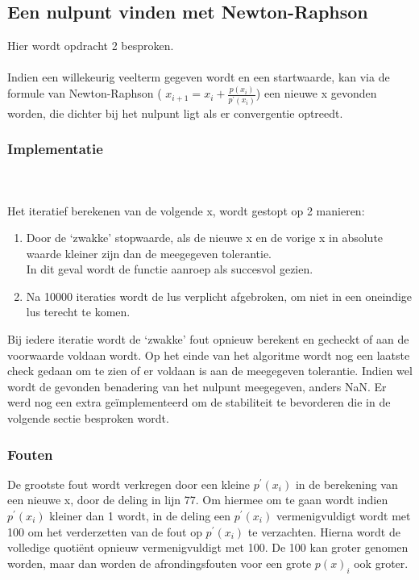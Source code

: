 \documentclass[a4paper,kulak]{kulakarticle}
\begin{document}
\subsection{Een nulpunt vinden met Newton-Raphson}
Hier wordt opdracht 2 besproken.
\\~\\
Indien een willekeurig veelterm gegeven wordt en een startwaarde, kan via de formule van Newton-Raphson (
$x_{i+1} = x_i + \frac{ p(x_i) }{ p^{'}(x_i) }$) een nieuwe x gevonden worden, die dichter bij het nulpunt ligt als er convergentie optreedt.

\subsubsection{Implementatie}
\label{sec:NR}

~\\~\\
Het iteratief berekenen van de volgende x, wordt gestopt op 2 manieren:
\begin{enumerate}
	\item Door de `zwakke' stopwaarde, als de nieuwe x en de vorige x in absolute waarde kleiner zijn dan de meegegeven tolerantie.\\
	In dit geval wordt de functie aanroep als succesvol gezien.
	\item Na 10000 iteraties wordt de lus verplicht afgebroken, om niet in een oneindige lus terecht te komen.
\end{enumerate}

Bij iedere iteratie wordt de `zwakke' fout opnieuw berekent en gecheckt of aan de voorwaarde voldaan wordt.
Op het einde van het algoritme wordt nog een laatste check gedaan om te zien of er voldaan is aan de meegegeven tolerantie. Indien wel wordt de gevonden benadering van het nulpunt meegegeven, anders NaN.
Er werd nog een extra geïmplementeerd om de stabiliteit te bevorderen die in de volgende sectie besproken wordt.

\subsubsection{Fouten}
De grootste fout wordt verkregen door een kleine $p^{'}(x_i)$ in de berekening van een nieuwe x, door de deling in lijn 77. Om hiermee om te gaan wordt indien $p^{'}(x_i)$ kleiner dan 1 wordt, in de deling een $p^{'}(x_i)$ vermenigvuldigt wordt met 100 om het verderzetten van de fout op $p^{'}(x_i)$ te verzachten. Hierna wordt de volledige quotiënt opnieuw vermenigvuldigt met 100. De 100 kan groter genomen worden, maar dan worden de afrondingsfouten voor een grote $p(x)_i$ ook groter.
\end{document}
